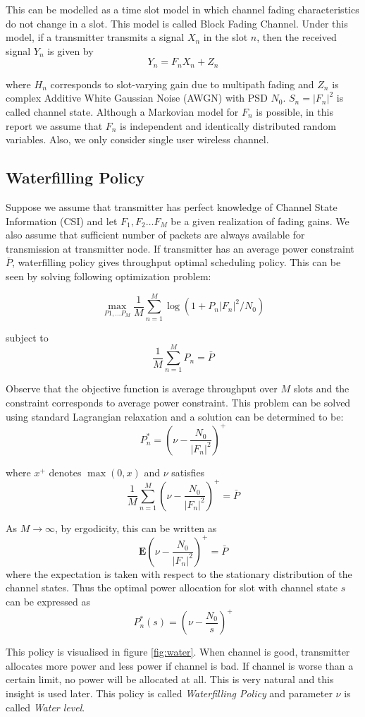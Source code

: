 \documentclass[a4paper,11pt]{article}
\begin{document}
This can be modelled as a time slot model in which channel fading characteristics do not change in a slot. This model is called Block Fading Channel. 
Under this model, if a transmitter transmits a signal $X_n$ in the slot $n$, then the received signal $Y_n$ is given by
\[Y_n = F_n X_n + Z_n \]

where $H_n$ corresponds to slot-varying gain due to multipath fading and $Z_n$ is complex Additive White Gaussian Noise (AWGN) with PSD $N_0$. 
$S_n = |F_n|^2$ is called channel state. Although a Markovian model for $F_n$ is possible, in this report we assume that $F_n$ is independent and identically distributed random variables.
Also, we only consider single user wireless channel.

\subsection{Waterfilling Policy}
Suppose we assume that transmitter has perfect knowledge of Channel State Information (CSI) and let $F_1,F_2 \dots F_M$ be a given realization of fading gains. We also assume that sufficient number of packets are always available for transmission at transmitter node.
If transmitter has an average power constraint $\bar{P}$, waterfilling policy gives  throughput optimal scheduling policy. This can be seen by solving following optimization problem:

\[ \max_{P1, \dots P_M} \frac{1}{M} \sum_{n=1}^M \log(1+ P_n |F_n|^2/N_0)\]

subject to 
\[\frac{1}{M} \sum_{n=1}^M P_n = \bar{P}\]

Observe that the objective function is average throughput over $M$ slots and the constraint corresponds to average power constraint.
This problem can be solved using standard Lagrangian relaxation and a solution can be determined to be:
\[ P_n^* = \left (\nu - \frac{N_0}{|F_n|^2} \right )^+ \]

where $x^+$ denotes $\max(0,x)$ and $\nu$ satisfies 
\[ \frac{1}{M} \sum_{n=1}^M \left (\nu - \frac{N_0}{|F_n|^2} \right )^+ = \bar{P}\]

As $M \rightarrow \infty$, by ergodicity, this can be written as
\[ \mathbf{E} \left (\nu - \frac{N_0}{|F_n|^2} \right )^+ = \bar{P}\]
where the expectation is taken with respect to the stationary distribution of the channel states. Thus the optimal power allocation for slot with channel state $s$ can be expressed as  
\[ P_n^*(s) = \left (\nu - \frac{N_0}{s} \right )^+ \]

This policy is visualised in figure \ref{fig:water}. When channel is good, transmitter allocates more power and less power if channel is bad. 
If channel is worse than a certain limit, no power will be allocated at all.
This is very natural and this insight is used later.
This policy is called \emph{Waterfilling Policy} and parameter $\nu$ is called \emph{Water level}.
\end{document}
